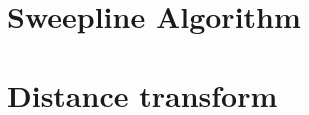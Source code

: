 \documentclass{egpubl}
\begin{document}
\section{Sweepline Algorithm}
\label{sec:sweepline-algorithm}



%

\section{Distance transform}
\label{sec:distance-transform}
\end{document}
